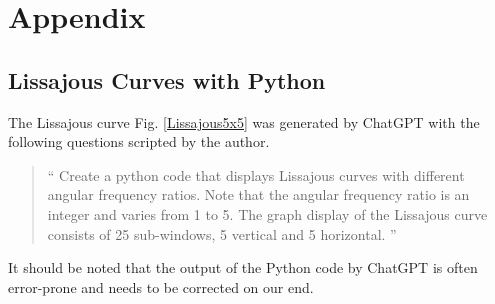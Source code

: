 \documentclass[%
 reprint,
 amsmath,amssymb,
 aps,
]{revtex4-1}
\numberwithin{equation}{section}%
\begin{document}
\section{Appendix}
\label{Appendix}

\subsection{Lissajous Curves with Python}
\label{}


The Lissajous curve Fig. \ref{Lissajous5x5} was generated by ChatGPT with the following questions scripted by the author.

    \begin{quote}
        ``
        Create a python code that displays Lissajous curves with different angular frequency ratios. Note that the angular frequency ratio is an integer and varies from 1 to 5. The graph display of the Lissajous curve consists of 25 sub-windows, 5 vertical and 5 horizontal.
        ''
    \end{quote}

It should be noted that the output of the Python code by ChatGPT is often error-prone and needs to be corrected on our end.

\end{document}

